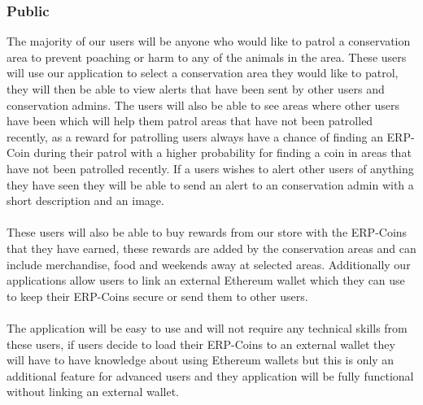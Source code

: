 \documentclass{article}
\begin{document}
\subsubsection*{Public}
The majority of our users will be anyone who would like to patrol a conservation area to prevent poaching or harm to any of the animals in the area. These users will use our application to select a conservation area they would like to patrol, they will then be able to view alerts that have been sent by other users and conservation admins. The users will also be able to see areas where other users have been which will help them patrol areas that have not been patrolled recently, as a reward for patrolling users always have a chance of finding an ERP-Coin during their patrol with a higher probability for finding a coin in areas that have not been patrolled recently. If a users wishes to alert other users of anything they have seen they will be able to send an alert to an conservation admin with a short description and an image.\\\\These users will also be able to buy rewards from our store with the ERP-Coins that they have earned, these rewards are added by the conservation areas and can include merchandise, food and weekends away at selected areas. Additionally our applications allow users to link an external Ethereum wallet which they can use to keep their ERP-Coins secure or send them to other users.\\\\The application will be easy to use and will not require any technical skills from these users, if users decide to load their ERP-Coins to an external wallet they will have to have knowledge about using Ethereum wallets but this is only an additional feature for advanced users and they application will be fully functional without linking an external wallet.
\end{document}
